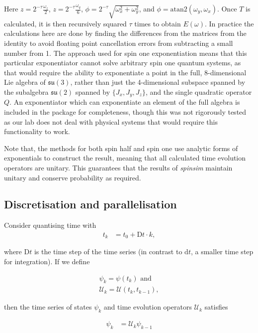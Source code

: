 \documentclass{jors}
\begin{document}
		Here \(z = 2^{-\tau}\frac{\omega_z}{2}\), \(z = 2^{-\tau}\frac{\omega_q}{6}\), \(\phi = 2^{-\tau}\sqrt{\omega_x^2 + \omega_y^2}\), and \(\phi = \mathrm{atan}2(\omega_y, \omega_x)\).
		Once \(T\) is calculated, it is then recursively squared \(\tau\) times to obtain \(E(\omega)\).
		In practice the calculations here are done by finding the differences from the matrices from the identity to avoid floating point cancellation errors from subtracting a small number from 1.
		The approach used for spin one exponentiation means that this particular exponentiator cannot solve arbitrary spin one quantum systems, as that would require the ability to exponentiate a point in the full, 8-dimensional Lie algebra of \(\mathfrak{su}(3)\), rather than just the 4-dimensional subspace spanned by the subalgebra \(\mathfrak{su}(2)\) spanned by \(\{J_x, J_y, J_z\}\), and the single quadratic operator \(Q\).
		An exponentiator which can exponentiate an element of the full algebra is included in the package for completeness, though this was not rigorously tested as our lab does not deal with physical systems that would require this functionality to work.

		Note that, the methods for both spin half and spin one use analytic forms of exponentials to construct the result, meaning that all calculated time evolution operators are unitary.
		This guarantees that the results of \emph{spinsim} maintain unitary and conserve probability as required.

	\subsection{Discretisation and parallelisation}
		Consider quantising time with
		\begin{align}
			t_k &= t_0 + \mathrm{D}t\cdot k,
		\end{align}

		where \(\mathrm{D}t\) is the time step of the time series (in contrast to \(\mathrm{d}t\), a smaller time step for integration).
		If we define

		\begin{align}
			\psi_k = \psi(t_k)\textrm{ and}\\
			\mathcal{U}_k = \mathcal{U}(t_{k}, t_{k-1}),
		\end{align}
		
		then the time series of states \(\psi_k\) and time evolution operators \(\mathcal{U}_k\) satisfies

		\begin{align}
			\psi_k &= \mathcal{U}_k\psi_{k-1}\label{eq:integration_compilation}
		\end{align}
\end{document}
